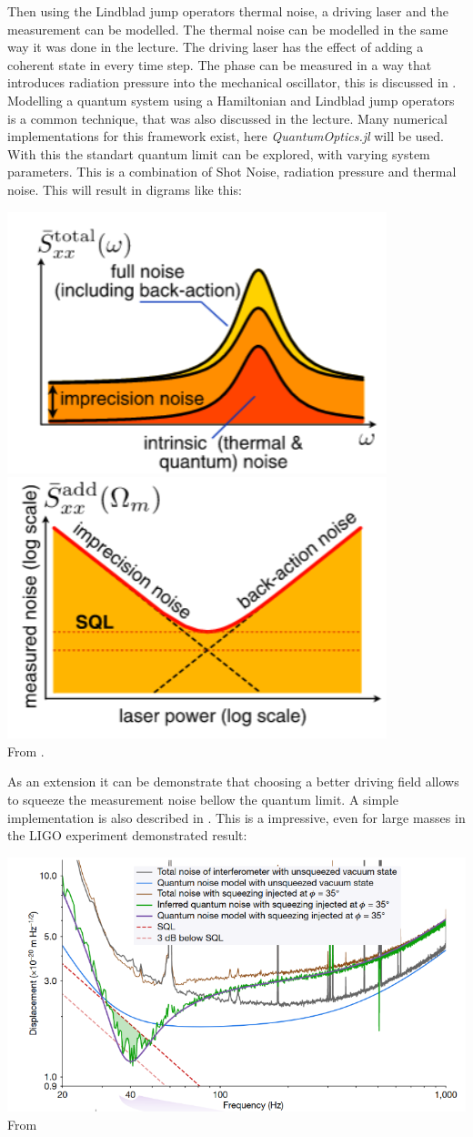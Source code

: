 \documentclass[
	a4page,
	parskip=full,
]{scrartcl}
\begin{document}
Then using the Lindblad jump operators thermal noise, a driving laser and the measurement can be modelled.
The thermal noise can be modelled in the same way it was done in the lecture.
The driving laser has the effect of adding a coherent state in every time step.
The phase can be measured in a way that introduces radiation pressure into the mechanical oscillator, this is discussed in \autocite{aspelmeyer_cavity_2014}.\\
Modelling a quantum system using a Hamiltonian and Lindblad jump operators is a common technique, that was also discussed in the lecture.
Many numerical implementations for this framework exist, here \textit{QuantumOptics.jl} will be used.\\
With this the standart quantum limit can be explored, with varying system parameters.
This is a combination of Shot Noise, radiation pressure and thermal noise.
This will result in digrams like this:
\begin{center}
	\includegraphics[width=.3\textwidth]{figures/a.png}
	\includegraphics[width=.3\textwidth]{figures/b.png}\\
	From \autocite[FIG. 22]{aspelmeyer_cavity_2014}.
\end{center}

As an extension it can be demonstrate that choosing a better driving field allows to squeeze the measurement noise bellow the quantum limit.
A simple implementation is also described in \cite[p. 1417]{aspelmeyer_cavity_2014}.
This is a impressive, even for large masses in the LIGO experiment demonstrated result: 
\begin{center}
	\includegraphics[width=.7\textwidth]{figures/ligo measurement.png}\\
	From \autocite[Fig. 2]{yu_quantum_2020}
\end{center}

\sloppy
\printbibliography
\end{document}
